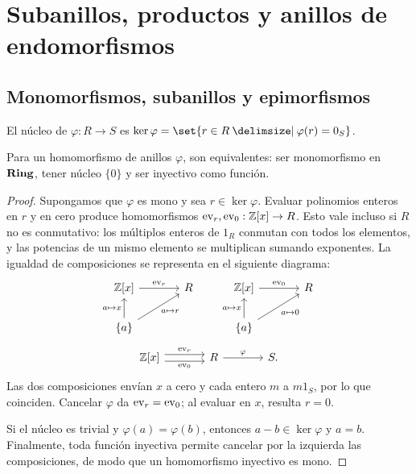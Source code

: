 \section{Subanillos, productos y anillos de endomorfismos}\label{sec:anillos-construcciones}

\subsection{Monomorfismos, subanillos y epimorfismos}\label{tema:11-2-3}
\begin{defi}
El núcleo de $\varphi:R\to S$ es $\ker\varphi=\set{r\in R\given\varphi(r)=0_S}$.
\end{defi}
\begin{prop}\label{prop:C11-mono}
Para un homomorfismo de anillos $\varphi$, son equivalentes: ser monomorfismo en $\mathbf{Ring}$, tener núcleo $\{0\}$ y ser inyectivo como función.
\end{prop}
\begin{proof}
Supongamos que $\varphi$ es mono y sea $r\in\ker\varphi$. Evaluar polinomios enteros en $r$ y en cero produce homomorfismos $\operatorname{ev}_r,\operatorname{ev}_0:\mathbb Z[x]\to R$. Esto vale incluso si $R$ no es conmutativo: los múltiplos enteros de $1_R$ conmutan con todos los elementos, y las potencias de un mismo elemento se multiplican sumando exponentes. La igualdad de composiciones se representa en el siguiente diagrama:
\[
\begin{tikzcd}[column sep=large]
\mathbb Z[x]\arrow[r,"\ev_r"]&R\\
\{a\}\arrow[u,"a\mapsto x"]\arrow[ur,"a\mapsto r"']&
\end{tikzcd}
\qquad
\begin{tikzcd}[column sep=large]
\mathbb Z[x]\arrow[r,"\ev_0"]&R\\
\{a\}\arrow[u,"a\mapsto x"]\arrow[ur,"a\mapsto0"']&
\end{tikzcd}
\]
\[
\begin{tikzcd}[column sep=large]
\mathbb Z[x]\arrow[r,shift left=.7ex,"\ev_r"]
\arrow[r,shift right=.7ex,"\ev_0"']&R\arrow[r,"\varphi"]&S.
\end{tikzcd}
\]
Las dos composiciones envían $x$ a cero y cada entero $m$ a $m1_S$, por lo que coinciden. Cancelar $\varphi$ da $\operatorname{ev}_r=\operatorname{ev}_0$; al evaluar en $x$, resulta $r=0$.

Si el núcleo es trivial y $\varphi(a)=\varphi(b)$, entonces $a-b\in\ker\varphi$ y $a=b$. Finalmente, toda función inyectiva permite cancelar por la izquierda las composiciones, de modo que un homomorfismo inyectivo es mono.
\end{proof}

